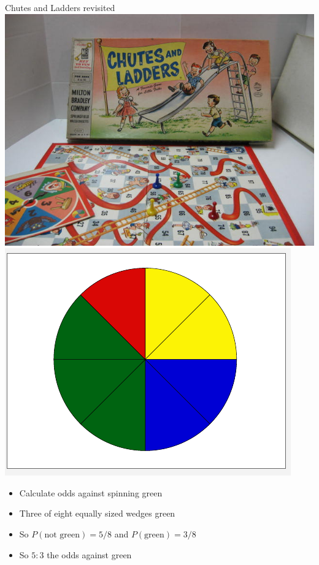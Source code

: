 \documentclass[handout]{beamer}
\theoremstyle{definition}
\begin{document}
\begin{frame}{Chutes and Ladders revisited}
\includegraphics[scale=.22]{ChutesAndLadders}
\includegraphics[scale=.30]{Spinner}
\begin{itemize}
\item Calculate odds against spinning green
\item Three of eight equally sized wedges green
\item So $P\left(\text{not green}\right)=5/8$
and $P\left(\text{green}\right)=3/8$
\item So $5:3$ the odds against green
\end{itemize}
\end{frame}
\end{document}
